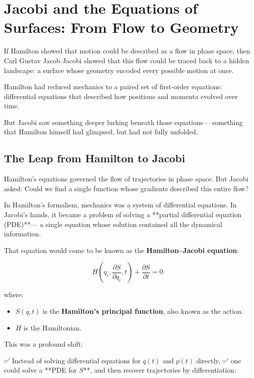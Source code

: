\section{Jacobi and the Equations of Surfaces: From Flow to Geometry}

If Hamilton showed that motion could be described as a flow in phase space,  
then Carl Gustav Jacob Jacobi showed that this flow could be traced back to a hidden landscape:  
a surface whose geometry encoded every possible motion at once.

Hamilton had reduced mechanics to a paired set of first-order equations:  
differential equations that described how positions and momenta evolved over time.

But Jacobi saw something deeper lurking beneath those equations—  
something that Hamilton himself had glimpsed, but had not fully unfolded.

\bigskip

\subsection*{The Leap from Hamilton to Jacobi}

Hamilton’s equations governed the flow of trajectories in phase space.  
But Jacobi asked:  
Could we find a single function whose gradients described this entire flow?

In Hamilton’s formalism, mechanics was a system of differential equations.  
In Jacobi’s hands, it became a problem of solving a **partial differential equation (PDE)**—  
a single equation whose solution contained all the dynamical information.

That equation would come to be known as the \textbf{Hamilton–Jacobi equation}:

\[
H\left( q_i, \frac{\partial S}{\partial q_i}, t \right) + \frac{\partial S}{\partial t} = 0
\]

where:

\begin{itemize}
  \item \( S(q,t) \) is the \textbf{Hamilton’s principal function}, also known as the action.
  \item \( H \) is the Hamiltonian.
\end{itemize}

\bigskip

This was a profound shift:

✅ Instead of solving differential equations for \( q(t) \) and \( p(t) \) directly,  
✅ one could solve a **PDE for \( S \)**, and then recover trajectories by differentiation:

